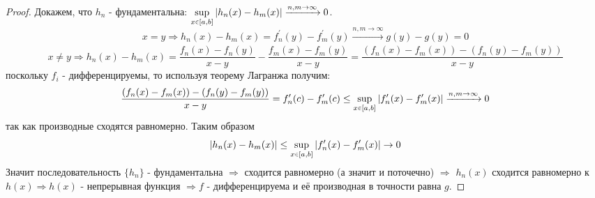 \documentclass[12pt]{article}
\theoremstyle{definition}
\newcommand{\smallerrel}[1]{\mathrel{\mathpalette\smallerrelaux{#1}}}
\newcommand{\smallerrelaux}[2]{\raisebox{.1ex}{\scalebox{.75}{$#1#2$}}}
\newcommand{\smallin}{\smallerrel{\in}}
\begin{document}
\begin{proof}
	Докажем, что $h_n$ - фундаментальна: $\sup\limits_{x \smallin [a,b]}|h_n(x) - h_m(x)| \xrightarrow[]{n,m \to \infty} 0$.
	$$
		x = y \Rightarrow h_n(x) - h_m(x) = f_n^\prime(y) - f_m^\prime(y) \xrightarrow[]{n,m \to \infty} g(y) - g(y) = 0
	$$
	$$
		x \neq y \Rightarrow h_n(x) - h_m(x) =  \dfrac{f_n(x) - f_n(y)}{x-y} -  \dfrac{f_m(x) - f_m(y)}{x-y} = \dfrac{(f_n(x) - f_m(x)) - (f_n(y) - f_m(y))}{x-y}
	$$
	поскольку $f_i$ - дифференцируемы, то используя теорему Лагранжа получим:
	$$
		\dfrac{(f_n(x) - f_m(x)) - (f_n(y) - f_m(y))}{x-y} = f_n^\prime(c) - f_m^\prime(c) \leq \sup\limits_{x \smallin [a,b]}|f_n^\prime(x) - f_m^\prime(x)| \xrightarrow[]{n,m \to \infty}  0 
	$$
	так как производные сходятся равномерно. Таким образом 
	$$
		|h_n(x) - h_m(x)| \leq \sup\limits_{x \smallin [a,b]}|f_n^\prime(x) - f_m^\prime(x)| \to 0
	$$
	Значит последовательность $\{h_n\}$ - фундаментальна $\Rightarrow$ сходится равномерно (а значит и поточечно) $\Rightarrow$ $h_n(x)$ сходится равномерно к $h(x) \Rightarrow h(x)$ - непрерывная функция $\Rightarrow f$ - дифференцируема и её производная в точности равна $g$. 
\end{proof}
\end{document}
